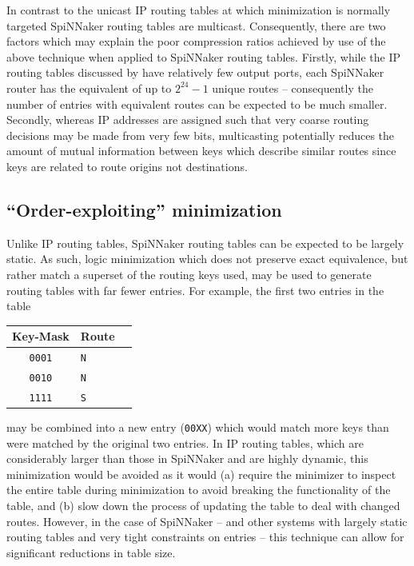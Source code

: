 \documentclass[conference]{IEEEtran}
\newcommand{\mytt}[1]{\texttt{\footnotesize#1}}
\begin{document}
In contrast to the unicast IP routing tables at which minimization is normally targeted SpiNNaker routing tables are multicast.
Consequently, there are two factors which may explain the poor compression ratios achieved by use of the above technique when applied to SpiNNaker routing tables.
Firstly, while the IP routing tables discussed by \textcite{Liu2002} have relatively few output ports, each SpiNNaker router has the equivalent of up to $2^{24} - 1$ unique routes -- consequently the number of entries with equivalent routes can be expected to be much smaller.
Secondly, whereas IP addresses are assigned such that very coarse routing decisions may be made from very few bits, multicasting potentially reduces the amount of mutual information between keys which describe similar routes since keys are related to route origins not destinations.

\subsection*{``Order-exploiting'' minimization}

Unlike IP routing tables, SpiNNaker routing tables can be expected to be largely static.
As such, logic minimization which does not preserve exact equivalence, but rather match a superset of the routing keys used, may be used to generate routing tables with far fewer entries.
For example, the first two entries in the table

  \begin{table}[H]
    \centering
    \begin{tabular}{c l l}
      \toprule
      Key-Mask & Route \\
      \midrule
      \texttt{0001} & \texttt{N} \\
      \texttt{0010} & \texttt{N} \\
      \texttt{1111} & \texttt{S} \\
      \bottomrule
    \end{tabular}
  \end{table}

\noindent may be combined into a new entry (\mytt{00XX}) which would match more keys than were matched by the original two entries.
In IP routing tables, which are considerably larger than those in SpiNNaker and are highly dynamic, this minimization would be avoided as it would (a) require the minimizer to inspect the entire table during minimization to avoid breaking the functionality of the table,
and (b) slow down the process of updating the table to deal with changed routes.
However, in the case of SpiNNaker -- and other systems with largely static routing tables and very tight constraints on entries -- this technique can allow for significant reductions in table size.
\end{document}
